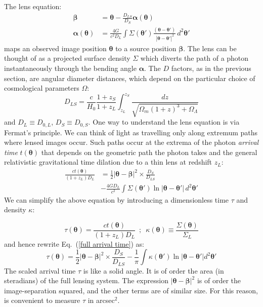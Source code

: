 \documentclass[galley,usenatbib]{mn2e}
\newcommand{\eqnref}[1] {Eq.~(\ref{#1})}
\renewcommand{\vec}[1]{\ensuremath{\boldsymbol{#1}}}
\begin{document}
The lens equation:
%
\begin{equation}
\begin{aligned}
    \vec\beta &= \vec\theta - \frac{D_{LS}}{D_S}\vec\alpha(\vec\theta) \\
\vec\alpha(\vec\theta) &= \frac{4G}{c^2D_L} \int \Sigma(\vec\theta')
                          \frac{(\vec\theta - \vec\theta')}
                          {\ |\vec\theta - \vec\theta'|^2} \, d^2\vec\theta'
\end{aligned}
\label{eqn:lens_equation}
\end{equation}
%
maps an observed image position $\vec\theta$ to a source position
$\vec\beta$.  The lens can be thought of as a projected surface
density $\Sigma$ which diverts the path of a photon instantaneously
through the bending angle $\vec\alpha$.  The $D$ factors, as in the previous section, are angular
diameter distances, which depend on the particular choice of cosmological
parameters $\Omega$:
\begin{equation}
D_{LS} = \frac c{H_0} \frac{1+z_S}{1+z_L} \int_{z_L}^{z_S}
                      \frac{dz}{\sqrt{\Omega_m(1+z)^3 + \Omega_\Lambda}}
\end{equation}
%
and $D_L \equiv D_{0,L}$, $D_S \equiv D_{0,S}$.
One way to understand the lens equation is via Fermat's principle. We
can think of light as travelling only along extremum paths where
lensed images occur. Such paths occur at
the extrema of the photon {\it arrival time\/} $t(\vec\theta)$
that depends on the geometric path the photon takes and the general
relativistic gravitational time dilation due to a thin lens at
redshift $z_L$:
\begin{equation}
\begin{aligned}
\frac{ct(\vec\theta)}{(1+z_L)D_{L}}
&= {\textstyle\frac12} |\vec\theta - \vec\beta|^2
   \times \frac{D_{S}}{D_{LS}} \\
&- \frac{4GD_L}{c^2}
   \int \Sigma(\vec\theta') \ln |\vec\theta-\vec\theta'| \, d^2\vec\theta'
\label{full arrival time}
\end{aligned}
\end{equation}
We can simplify the above equation by introducing a dimensionless time $\tau$ and density $\kappa$: 

\begin{equation}
\tau(\vec\theta) = \frac{ct(\vec\theta)}{(1+z_L)D_{L}} \,\,\,;\,\,\, \kappa(\vec\theta) \equiv \frac{\Sigma(\vec\theta)}{\Sigma_L}
\end{equation}
and hence rewrite \eqnref{full arrival time} as:
\begin{equation}
\tau(\vec\theta) = {\textstyle\frac12} |\vec\theta - \vec\beta|^2
                   \times \frac{D_{S}}{D_{LS}}
                 - \frac1\pi \int \kappa (\vec\theta')
                   \ln|\vec\theta - \vec\theta'| d^2\vec\theta'
\label{arrival time}
\end{equation}
The scaled arrival time $\tau$ is like a solid angle. It is of order
the area (in steradians) of the full lensing system. The expression
$|\vec\theta - \vec\beta|^2$ is of order the image-separation
squared, and the other terms are of similar size.  For this reason, is
convenient to measure $\tau$ in arcsec$^{2}$.
\end{document}
